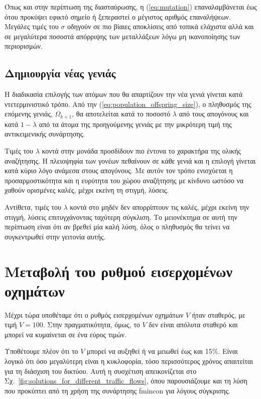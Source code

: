 \documentclass[a4paper,12pt]{article}
\begin{document}
Όπως και στην περίπτωση της διασταύρωσης, η (\ref{eq:mutation}) επαναλαμβάνεται έως ότου προκύψει εφικτό σημείο
ή ξεπεραστεί ο μέγιστος αριθμός επαναλήψεων. Μεγάλες τιμές του $\sigma$ οδηγούν σε πιο βίαιες αποκλίσεις από
τοπικά ελάχιστα αλλά και σε μεγαλύτερα ποσοστά απόρριψης των μεταλλάξεων λόγω μη ικανοποίησης των περιορισμών.

\subsection{Δημιουργία νέας γενιάς}
Η διαδικασία επιλογής των ατόμων που θα απαρτίζουν την νέα γενιά γίνεται κατά ντετερμινιστικό τρόπο. Από την
(\ref{eq:population_offspring_size}), ο πληθυσμός της επόμενης γενιάς, $\Omega_{k+1}$, θα αποτελείται κατά το
ποσοστό $\lambda$ από τους απογόνους και κατά $1 - \lambda$ από τα άτομα της προηγούμενης γενιάς με την μικρότερη
τιμή της αντικειμενικής συνάρτησης.

Τιμές του $\lambda$ κοντά στην μονάδα προσδίδουν πιο έντονα το χαρακτήρα της ολικής αναζήτησης. Η πλειοψηφία των
γονέων πεθαίνουν σε κάθε γενιά και η επιλογή γίνεται κατά κύριο λόγο ανάμεσα στους απογόνους. Με αυτόν τον τρόπο 
ενισχύεται η προσαρμοστικότητα και η ευρύτητα του χώρου αναζήτησης με κίνδυνο ωστόσο να χαθούν ορισμένες καλές,
μέχρι εκείνη τη στιγμή, λύσεις.

Αντίθετα, τιμές του $\lambda$ κοντά στο μηδέν δεν απορρίπτουν τις καλές, μέχρι εκείνη την στιγμή, λύσεις 
επιτυγχάνοντας ταχύτερη σύγκλιση. Το μειονέκτημα σε αυτή την περίπτωση είναι ότι αν βρεθεί μία καλή λύση,
όλος ο πληθυσμός θα τείνει να συγκεντρωθεί στην γειτονία αυτής.

\section{Μεταβολή του ρυθμού εισερχομένων οχημάτων}

Μέχρι τώρα υποθέταμε ότι ο ρυθμός εισερχομένων οχημάτων $V$ ήταν σταθερός, με τιμή $V = 100$.  
Στην πραγματικότητα, όμως, το $V$ δεν είναι απόλυτα σταθερό και μπορεί να κυμαίνεται σε ένα εύρος τιμών.  

Υποθέτουμε πλέον ότι το $V$ μπορεί να αυξηθεί ή να μειωθεί έως και 15\%.  
Είναι λογικό ότι όσο μεγαλύτερη είναι η κυκλοφορία, τόσο περισσότερος χρόνος απαιτείται  
για τη διάσχιση του δικτύου. Αυτή η συσχέτιση απεικονίζεται στο Σχ.~\ref{fig:solutions_for_different_traffic_flows},  
όπου παρουσιάζουμε και τη λύση που προκύπτει από τη χρήση της συνάρτησης 
fmincon για λόγους σύγκρισης.
\end{document}
